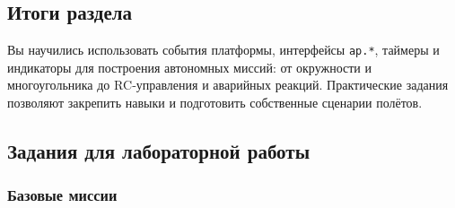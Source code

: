 \subsection*{Итоги раздела}
Вы научились использовать события платформы, интерфейсы \texttt{ap.*}, таймеры и индикаторы для построения автономных миссий: от окружности и многоугольника до RC‑управления и аварийных реакций. Практические задания позволяют закрепить навыки и подготовить собственные сценарии полётов.

\subsection{Задания для лабораторной работы}
\subsubsection{Базовые миссии}
